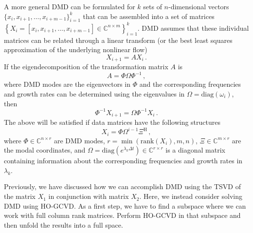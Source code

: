 \documentclass[10pt]{article}
\begin{document}
A more general DMD can be formulated for $k$ sets of $n$-dimensional vectors $\{x_i,x_{i+1},\ldots,x_{i+m-1}\}_{i=1}^k$ that can be assembled into a set of matrices $\left\{
X_i=[x_i, x_{i+1}, \ldots,x_{i+m-1}]\in \mathbb{C}^{n\times m}\right\}_{i=1}^k$.
DMD assumes that these individual matrices can be related through a linear transform (or the best least squares approximation of the underlying nonlinear flow)
\begin{equation}\label{DMDeq}
X_{i+1} = A X_i\,.
\end{equation}
If the eigendecomposition of the transformation matrix $A$ is
\begin{equation}\label{DMDeq1}
A = \Phi \Omega \Phi^{-1} \,,
\end{equation}
where DMD modes are the eigenvectors in $\Phi$ and the corresponding frequencies and growth rates can be determined using the eigenvalues in $\Omega=\mathrm{diag}(\omega_{i})$, then
\begin{equation}
    \Phi^{-1}X_{i+1} = \Omega \Phi^{-1}X_i\,.
\end{equation}
The above will be satisfied if data matrices have the following structures
\begin{equation}\label{DMDs}
    X_i = \Phi \Omega^{i-1} \Xi^\mathrm{H}\,,
\end{equation}
where $\Phi\in \mathbb{C}^{n\times r}$ are DMD modes, $r = \min \left( \mathrm{rank}(X_i), m, n\right)$, $\Xi \in \mathbb{C}^{m\times r}$ are the modal coordinates, and $\Omega = \mathrm{diag}\left( e^{\lambda_k\Delta t}\right)\in \mathbb{C}^{r\times r}$ is a diagonal matrix containing information about the corresponding frequencies and growth rates in $\lambda_k$.

Previously, we have discussed how we can accomplish DMD using the TSVD of the matrix $X_1$ in conjunction with matrix $X_2$.
Here, we instead consider solving DMD using HO-GCVD.
As a first step, we have to find a subspace where we can work with full column rank matrices.
Perform HO-GCVD in that subspace and then unfold the results into a full space.\\
\end{document}
